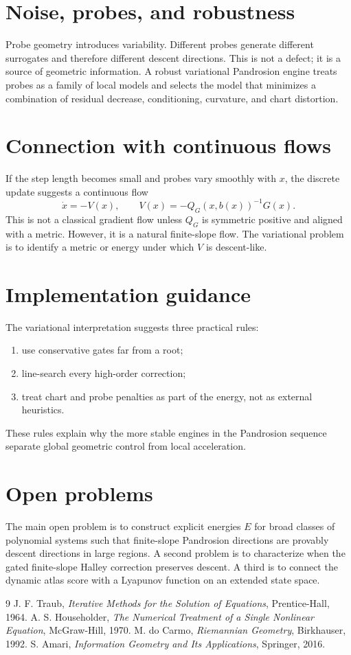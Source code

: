\documentclass[11pt]{article}
\begin{document}
\section{Noise, probes, and robustness}
Probe geometry introduces variability.  Different probes generate different surrogates and therefore different descent directions.  This is not a defect; it is a source of geometric information.  A robust variational Pandrosion engine treats probes as a family of local models and selects the model that minimizes a combination of residual decrease, conditioning, curvature, and chart distortion.

\section{Connection with continuous flows}
If the step length becomes small and probes vary smoothly with $x$, the discrete update suggests a continuous flow
\[
        \dot x=-V(x),\qquad V(x)=-Q_G(x,b(x))^{-1}G(x).
\]
This is not a classical gradient flow unless $Q_G$ is symmetric positive and aligned with a metric.  However, it is a natural finite-slope flow.  The variational problem is to identify a metric or energy under which $V$ is descent-like.

\section{Implementation guidance}
The variational interpretation suggests three practical rules:
\begin{enumerate}[leftmargin=2em]
\item use conservative gates far from a root;
\item line-search every high-order correction;
\item treat chart and probe penalties as part of the energy, not as external heuristics.
\end{enumerate}
These rules explain why the more stable engines in the Pandrosion sequence separate global geometric control from local acceleration.

\section{Open problems}
The main open problem is to construct explicit energies $E$ for broad classes of polynomial systems such that finite-slope Pandrosion directions are provably descent directions in large regions.  A second problem is to characterize when the gated finite-slope Halley correction preserves descent.  A third is to connect the dynamic atlas score with a Lyapunov function on an extended state space.

\begin{thebibliography}{9}
 J. F. Traub, \emph{Iterative Methods for the Solution of Equations}, Prentice-Hall, 1964.
 A. S. Householder, \emph{The Numerical Treatment of a Single Nonlinear Equation}, McGraw-Hill, 1970.
 M. do Carmo, \emph{Riemannian Geometry}, Birkhauser, 1992.
 S. Amari, \emph{Information Geometry and Its Applications}, Springer, 2016.
\end{thebibliography}
\end{document}
